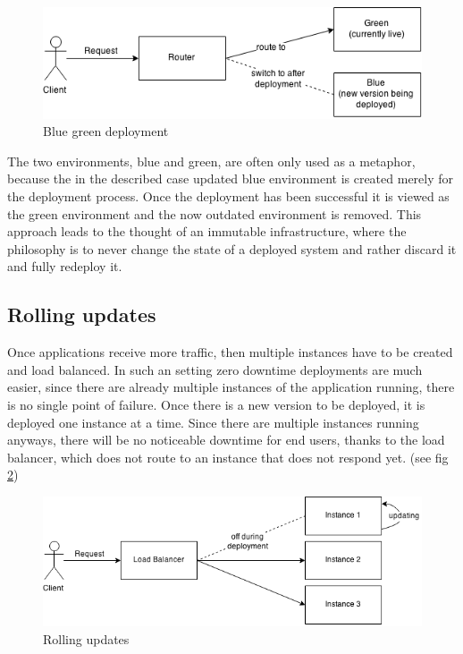 \begin{figure}
  \includegraphics[scale=0.55]{pictures/blue_green_deployment.png}
  \caption{Blue green deployment}
  \centering
  \label{fig:blue_green_deployment}
\end{figure}

The two environments, blue and green, are often only used as a metaphor,
because the in the described case updated blue environment is created merely
for the deployment process. Once the deployment has been successful it is
viewed as the green environment and the now outdated environment is removed.
This approach leads to the thought of an immutable infrastructure, where the
philosophy is to never change the state of a deployed system and rather discard
it and fully redeploy it.

\subsection{Rolling updates}

Once applications receive more traffic, then multiple instances have to be
created and load balanced. In such an setting zero downtime deployments are
much easier, since there are already multiple instances of the application
running, there is no single point of failure. Once there is a new version to be
deployed, it is deployed one instance at a time. Since there are multiple
instances running anyways, there will be no noticeable downtime for end users,
thanks to the load balancer, which does not route to an instance that does not
respond yet. (see fig \ref{fig:rolling_updates})

\begin{figure}
  \includegraphics[scale=0.55]{pictures/rolling_updates.png}
  \caption{Rolling updates}
  \centering
  \label{fig:rolling_updates}
\end{figure}

